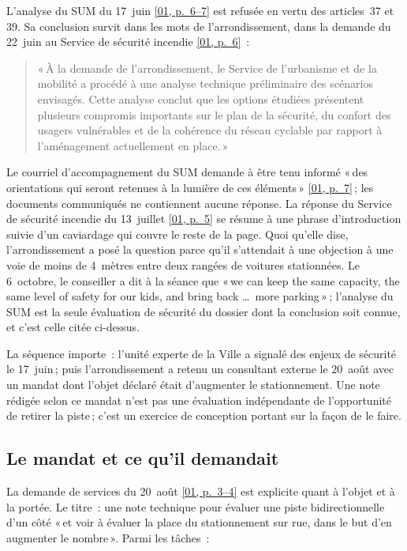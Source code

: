 \documentclass[11pt,letterpaper]{article}
\newcommand{\pagesurl}{https://openmobilitydata.github.io/Terrebonne-access-requests}
\newcommand{\pgl}[3]{\href{\pagesurl/\csname bundle#1\endcsname\#page=#2}{\textsf{\small[#1, p.~#3]}}}
\newcommand{\pg}[2]{\pgl{#1}{#2}{#2}}
\newcommand{\quot}[1]{\begin{quote}\small #1\end{quote}}
\begin{document}
L'analyse du SUM du 17~juin \pgl{01}{6}{6--7} est refusée en vertu des
articles~37 et 39. Sa conclusion survit dans les mots de l'arrondissement,
dans la demande du 22~juin au Service de sécurité incendie \pg{01}{6}~:

\quot{«\,À la demande de l'arrondissement, le Service de l'urbanisme et de la
mobilité a procédé à une analyse technique préliminaire des scénarios
envisagés. Cette analyse conclut que les options étudiées présentent
plusieurs compromis importants sur le plan de la sécurité, du confort des
usagers vulnérables et de la cohérence du réseau cyclable par rapport à
l'aménagement actuellement en place.\,»}

Le courriel d'accompagnement du SUM demande à être tenu informé «\,des
orientations qui seront retenues à la lumière de ces éléments\,»
\pg{01}{7}\,; les documents communiqués ne contiennent aucune réponse. La
réponse du Service de sécurité incendie du 13~juillet \pg{01}{5} se résume à
une phrase d'introduction suivie d'un caviardage qui couvre le reste de la
page. Quoi qu'elle dise, l'arrondissement a posé la question parce qu'il
s'attendait à une objection à une voie de moins de 4~mètres entre deux
rangées de voitures stationnées. Le 6~octobre, le conseiller a dit à la
séance que «\,we can keep the same capacity, the same level of safety for
our kids, and bring back \ldots\ more parking\,»\,; l'analyse du SUM est la
seule évaluation de sécurité du dossier dont la conclusion soit connue, et
c'est celle citée ci-dessus.

La séquence importe~: l'unité experte de la Ville a signalé des enjeux de
sécurité le 17~juin\,; puis l'arrondissement a retenu un consultant
externe le 20~août avec un mandat dont l'objet déclaré était d'augmenter le
stationnement. Une note rédigée selon ce mandat n'est pas une évaluation
indépendante de l'opportunité de retirer la piste\,; c'est un exercice de
conception portant sur la façon de le faire.

\subsection{Le mandat et ce qu'il demandait}

La demande de services du 20~août \pgl{01}{3}{3--4} est explicite quant à
l'objet et à la portée. Le titre~: une note technique pour évaluer une
piste bidirectionnelle d'un côté «\,et voir à évaluer la place du
stationnement sur rue, dans le but d'en augmenter le nombre\,». Parmi les
tâches~:
\end{document}
